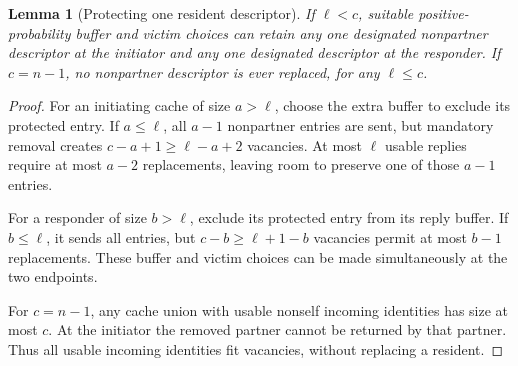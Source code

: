 \documentclass[11pt]{article}
\newtheorem{lemma}[theorem]{Lemma}
\begin{document}
\begin{lemma}[Protecting one resident descriptor]
\label{lem:protect}
If $\ell<c$, suitable positive-probability buffer and victim
choices can retain any one designated nonpartner descriptor at
the initiator and any one designated descriptor at the responder.
If $c=n-1$, no nonpartner descriptor is ever replaced, for any
$\ell\le c$.
\end{lemma}
\begin{proof}
For an initiating cache of size $a>\ell$, choose the extra buffer
to exclude its protected entry. If $a\le\ell$, all $a-1$
nonpartner entries are sent, but mandatory removal creates
$c-a+1\ge\ell-a+2$ vacancies. At most $\ell$ usable replies
require at most $a-2$ replacements, leaving room to preserve
one of those $a-1$ entries.

For a responder of size $b>\ell$, exclude its protected entry
from its reply buffer. If $b\le\ell$, it sends all entries, but
$c-b\ge\ell+1-b$ vacancies permit at most $b-1$ replacements.
These buffer and victim choices can be made simultaneously at
the two endpoints.

For $c=n-1$, any cache union with usable nonself incoming
identities has size at most $c$. At the initiator the removed
partner cannot be returned by that partner. Thus all usable
incoming identities fit vacancies, without replacing a resident.
\end{proof}
\end{document}
